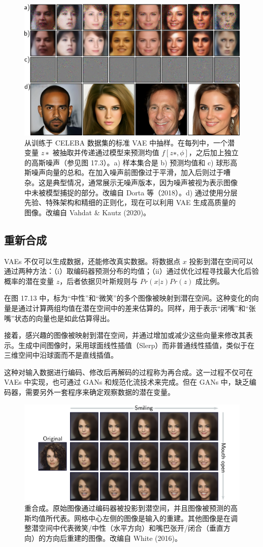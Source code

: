 \begin{figure}[ht!]
\centering
\includegraphics[width=0.7\linewidth]{png/chapter17/VAEGen.png}
\caption{从训练于 CELEBA 数据集的标准 VAE 中抽样。在每列中，一个潜变量 \(z∗\) 被抽取并传递通过模型来预测均值 \(f[z∗, \phi]\)，之后加上独立的高斯噪声（参见图 17.3）。a) 样本集合是 b) 预测均值和 c) 球形高斯噪声向量的总和。在加入噪声前图像过于平滑，加入后则过于嘈杂。这是典型情况，通常展示无噪声版本，因为噪声被视为表示图像中未被模型捕捉的部分。改编自 Dorta 等（2018）。d) 通过使用分层先验、特殊架构和精细的正则化，现在可以利用 VAE 生成高质量的图像。改编自 Vahdat \& Kautz (2020)。}
\end{figure}


\subsection{重新合成}
VAEs 不仅可以生成数据，还能修改真实数据。将数据点 \(x\) 投影到潜在空间可以通过两种方法：（i）取编码器预测分布的均值；（ii）通过优化过程寻找最大化后验概率的潜在变量 \(z\)，后者依据贝叶斯规则与 \(Pr(x|z)Pr(z)\) 成比例。

在图 17.13 中，标为“中性”和“微笑”的多个图像被映射到潜在空间。这种变化的向量是通过计算两组均值在潜在空间中的差来估算的。同样，用于表示“闭嘴”和“张嘴”状态的向量也是如此估算得出。

接着，感兴趣的图像被映射到潜在空间，并通过增加或减少这些向量来修改其表示。生成中间图像时，采用球面线性插值（Slerp）而非普通线性插值，类似于在三维空间中沿球面而不是直线插值。

这种对输入数据进行编码、修改后再解码的过程称为再合成。这一过程不仅可在 VAEs 中实现，也可通过 GANs 和规范化流技术来完成。但在 GANs 中，缺乏编码器，需要另外一套程序来确定观察数据的潜在变量。

\begin{figure}[ht!]
\centering
\includegraphics[width=0.7\linewidth]{png/chapter17/VAESmile.png}
\caption{重合成。原始图像通过编码器被投影到潜空间，并且图像被预测的高斯均值所代表。网格中心左侧的图像是输入的重建。其他图像是在调整潜空间中代表微笑/中性（水平方向）和嘴巴张开/闭合（垂直方向）的方向后重建的图像。改编自 White (2016)。}
\end{figure}


